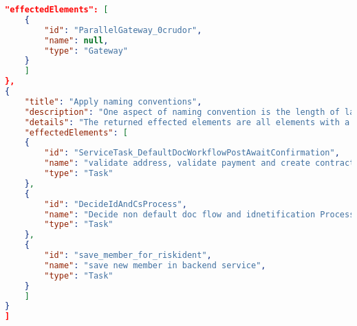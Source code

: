 \begin{lstlisting}[breaklines=true, language=json]
	"effectedElements": [
	{
		"id": "ParallelGateway_0crudor",
		"name": null,
		"type": "Gateway"
	}
	]
},
{
	"title": "Apply naming conventions",
	"description": "One aspect of naming convention is the length of labels, this rule scanns the bpmn for rlements with long labels (> 5 words)",
	"details": "The returned effected elements are all elements with a label that has more than 5 words",
	"effectedElements": [
	{
		"id": "ServiceTask_DefaultDocWorkflowPostAwaitConfirmation",
		"name": "validate address, validate payment and create contract",
		"type": "Task"
	},
	{
		"id": "DecideIdAndCsProcess",
		"name": "Decide non default doc flow and idnetification Process",
		"type": "Task"
	},
	{
		"id": "save_member_for_riskident",
		"name": "save new member in backend service",
		"type": "Task"
	}
	]
}
]
\end{lstlisting}